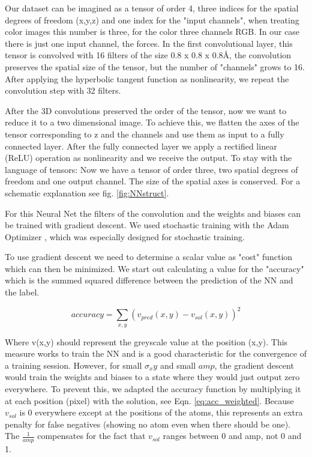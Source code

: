 \documentclass{article}
\begin{document}
Our dataset can be imagined as a tensor of order 4, three indices for the spatial degrees of freedom (x,y,z) and one index for the "input channels", when treating color images this number is three, for the color three channels RGB. In our case there is just one input channel, the forces. In the first convolutional layer, this tensor is convolved with 16 filters of the size 0.8 x 0.8 x 0.8{\AA}, the convolution preserves the spatial size of the tensor, but the number of "channels" grows to 16. After applying the hyperbolic tangent function as nonlinearity, we repeat the convolution step with 32 filters.

After the 3D convolutions preserved the order of the tensor, now we want to reduce it to a two dimensional image. To achieve this, we flatten the axes of the tensor corresponding to z and the channels and use them as input to a fully connected layer. After the fully connected layer we apply a rectified linear (ReLU) operation as nonlinearity and we receive the output. To stay with the language of tensors: Now we have a tensor of order three, two spatial degrees of freedom and one output channel. The size of the spatial axes is conserved. For a schematic explanation see fig. \ref{fig:NNstruct}.

For this Neural Net the filters of the convolution and the weights and biases can be trained with gradient descent. We used stochastic training with the Adam Optimizer \cite{kingma2014adam}, which was especially designed for stochastic training. 

To use gradient descent we need to determine a scalar value as "cost" function which can then be minimized. We start out calculating a value for the "accuracy" which is the summed squared difference between the prediction of the NN and the label.

\begin{equation}
accuracy = \sum_{x, y} (v_{pred}(x,y)-v_{sol}(x,y))^2
\end{equation}

Where v(x,y) should represent the greyscale value at the position (x,y). This measure works to train the NN and is a good characteristic for the convergence of a training session. However, for small $\sigma_xy$ and small $amp$, the gradient descent would train the weights and biases to a state where they would just output zero everywhere. To prevent this, we adapted the accuracy function by multiplying it at each position (pixel) with the solution, see Eqn. \eqref{eq:acc_weighted}. Because $v_{sol}$ is 0 everywhere except at the positions of the atoms, this represents an extra penalty for false negatives (showing no atom even when there should be one). The $\frac{1}{amp}$ compensates for the fact that $v_{sol}$ ranges between 0 and amp, not 0 and 1.
\end{document}
